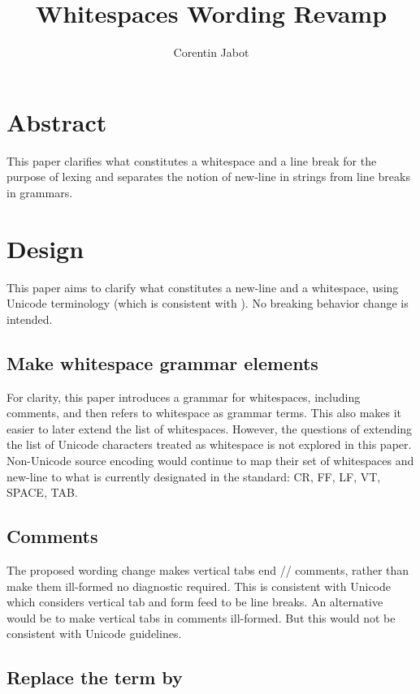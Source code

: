 \documentclass{wg21}
\title{Whitespaces Wording Revamp}
\author{Corentin Jabot}{corentin.jabot@gmail.com}
\begin{document}
\maketitle

\section{Abstract}

This paper clarifies what constitutes a whitespace and a line break for the purpose of lexing and separates the notion of new-line in strings from line breaks in grammars.

\section{Design}

This paper aims to clarify what constitutes a new-line and a whitespace, using Unicode terminology (which is consistent with ).
No breaking behavior change is intended.

\subsection{Make whitespace grammar elements}

For clarity, this paper introduces a grammar for whitespaces, including comments, and then refers to whitespace as grammar terms.
This also makes it easier to later extend the list of whitespaces.
However, the questions of extending the list of Unicode characters
treated as whitespace is not explored in this paper.
Non-Unicode source encoding would continue to map their set of whitespaces and new-line to what is currently designated in the standard: CR, FF, LF, VT, SPACE, TAB.

\subsection{Comments}

The proposed wording change makes vertical tabs end // comments, rather than make them ill-formed no diagnostic required.
This is consistent with Unicode which considers vertical tab and form feed to be line breaks.
An alternative would be to make vertical tabs in comments ill-formed. But this would not be consistent with Unicode guidelines.

\subsection{Replace the term  by }
\end{document}
